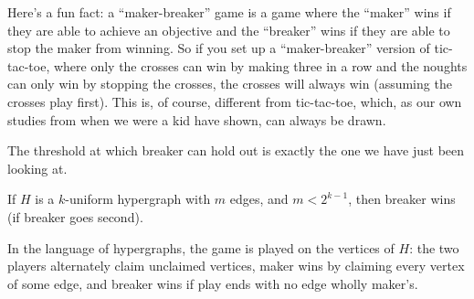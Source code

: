 Here's a fun fact: a ``maker-breaker'' game is a game where the ``maker'' wins if they are able to achieve an objective and the ``breaker'' wins if they are able to stop the maker from winning. So if you set up a ``maker-breaker'' version of tic-tac-toe, where only the crosses can win by making three in a row and the noughts can only win by stopping the crosses, the crosses will always win (assuming the crosses play first). This is, of course, different from tic-tac-toe, which, as our own studies from when we were a kid have shown, can always be drawn.

The threshold at which breaker can hold out is exactly the one we have just been looking at.

\begin{boxtheorem}
    If $H$ is a $k$-uniform hypergraph with $m$ edges, and $m < 2^{k - 1}$, then breaker wins (if breaker goes second).
\end{boxtheorem}

In the language of hypergraphs, the game is played on the vertices of $H$: the two players alternately claim unclaimed vertices, maker wins by claiming every vertex of some edge, and breaker wins if play ends with no edge wholly maker's.

